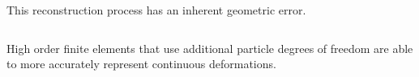 \documentclass[notes=hide,8pt,xcolor=svgnames]{beamer}
\begin{document}
\begin{frame}
\begin{columns}[T]
\begin{column}{0.35\textwidth}
   This reconstruction process has an inherent geometric error.
  \end{column}
 \end{columns}
 \begin{block}{}
 \small
 High order finite elements that use additional particle degrees of freedom are
 able to more accurately represent continuous deformations.
 \end{block}
\end{frame}
\end{document}
